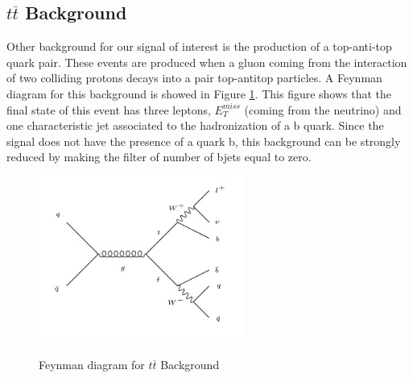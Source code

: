  \subsection{$t \overline{t}$ Background}
 
 Other background for our signal of interest is the production of a top-anti-top quark pair. These events are produced when a gluon coming from the interaction of two colliding protons decays into a pair top-antitop particles. A Feynman diagram for this background is showed in Figure \ref{t_tbar_feynman}. This figure shows that the final state of this event has three leptons, $E^{miss}_{T}$ (coming from the neutrino) and one characteristic jet associated to the hadronization of a b quark. Since the signal does not have the presence of a quark b, this background can be strongly reduced by 
 making the filter of number of bjets equal to zero.
 
 
  \begin{figure}[h] 
 \centering
 \caption{Feynman diagram for $t \overline{t}$ Background}
 \includegraphics[width=0.6\textwidth]{./Capitulos/Model/ttbar}  
 \label{t_tbar_feynman}
 \end{figure} 
 
 
 
 
 